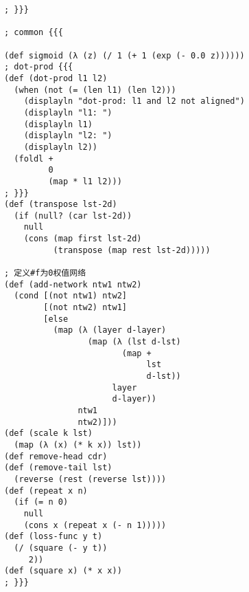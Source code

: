 \documentclass{article}
\begin{document}
\begin{lstlisting}
; }}}

; common {{{

(def sigmoid (λ (z) (/ 1 (+ 1 (exp (- 0.0 z))))))
; dot-prod {{{
(def (dot-prod l1 l2)
  (when (not (= (len l1) (len l2)))
    (displayln "dot-prod: l1 and l2 not aligned")
    (displayln "l1: ")
    (displayln l1)
    (displayln "l2: ")
    (displayln l2))
  (foldl +
         0
         (map * l1 l2)))
; }}}
(def (transpose lst-2d)
  (if (null? (car lst-2d))
    null
    (cons (map first lst-2d)
          (transpose (map rest lst-2d)))))

; 定义#f为0权值网络
(def (add-network ntw1 ntw2)
  (cond [(not ntw1) ntw2]
        [(not ntw2) ntw1]
        [else
          (map (λ (layer d-layer)
                 (map (λ (lst d-lst)
                        (map +
                             lst
                             d-lst))
                      layer
                      d-layer))
               ntw1
               ntw2)]))
(def (scale k lst)
  (map (λ (x) (* k x)) lst))
(def remove-head cdr)
(def (remove-tail lst)
  (reverse (rest (reverse lst))))
(def (repeat x n)
  (if (= n 0)
    null
    (cons x (repeat x (- n 1)))))
(def (loss-func y t)
  (/ (square (- y t))
     2))
(def (square x) (* x x))
; }}}
  \end{lstlisting}
\end{document}

